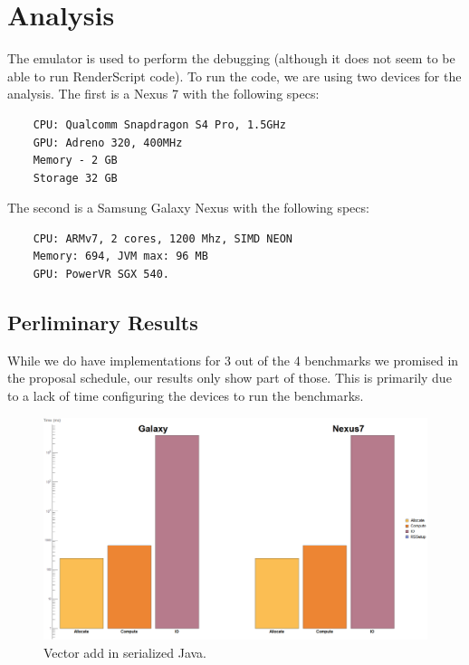 \section*{Analysis}

The emulator is used to perform the debugging (although it does not seem to be able to run RenderScript code).
To run the code, we are using two devices for the analysis.
The first is a Nexus 7 with the following specs:

\begin{verbatim}
    CPU: Qualcomm Snapdragon S4 Pro, 1.5GHz
    GPU: Adreno 320, 400MHz
    Memory - 2 GB
    Storage 32 GB
\end{verbatim}

The second is a Samsung Galaxy Nexus with the following specs:

\begin{verbatim}
    CPU: ARMv7, 2 cores, 1200 Mhz, SIMD NEON
    Memory: 694, JVM max: 96 MB
    GPU: PowerVR SGX 540.
\end{verbatim}


\subsection*{Perliminary Results}

While we do have implementations for 3 out of the 4 benchmarks we promised in the proposal schedule,
  our results only show part of those.
This is primarily due to a lack of time configuring the devices to run the benchmarks.


\begin{figure}[t!]
\includegraphics[scale=0.125]{VectorAddJava.png}
\caption{Vector add in serialized Java.}
\label{fig:schedule}
\centering
\end{figure}

